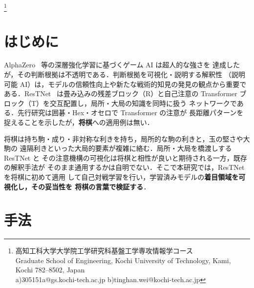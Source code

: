 \documentclass[a4paper,10pt,twocolumn]{ltjsarticle}
\newcommand{\blfootnote}[1]{%
  \begingroup
  \renewcommand\thefootnote{}\footnote{#1}%
  \addtocounter{footnote}{-1}%
  \endgroup}
\begin{document}

\blfootnote{\quad 高知工科大学大学院工学研究科基盤工学専攻情報学コース\\
\phantom{1\quad}Graduate School of Engineering, Kochi University of
Technology, Kami, Kochi 782--8502, Japan\\
a)\quad 305151a@gs.kochi-tech.ac.jp\quad
b)\quad tinghan.wei@kochi-tech.ac.jp}

\section{はじめに}
AlphaZero~\cite{alphazero} 等の深層強化学習に基づくゲーム AI は超人的な強さを
達成したが，その判断根拠は不透明である．判断根拠を可視化・説明する解釈性
（説明可能 AI）は，モデルの信頼性向上や新たな戦術的知見の発見の観点から重要で
ある．ResTNet~\cite{restnet} は畳み込みの残差ブロック（R）と自己注意の
Transformer ブロック（T）を交互配置し，局所・大局の知識を同時に扱う
ネットワークである．先行研究は囲碁・Hex・オセロで Transformer の注意が
長距離パターンを捉えることを示したが，\textbf{将棋}への適用例は無い．

将棋は持ち駒・成り・非対称な利きを持ち，局所的な駒の利きと，玉の堅さや大駒の
遠隔利きといった大局的要素が複雑に絡む．局所・大局を橋渡しする ResTNet と
その注意機構の可視化は将棋と相性が良いと期待される一方，既存の解釈手法が
そのまま通用するかは自明でない．そこで本研究では，ResTNet を将棋に初めて適用
して自己対戦学習を行い，学習済みモデルの\textbf{着目領域を可視化し，その妥当性を
将棋の言葉で検証する}．

\section{手法}
\end{document}
